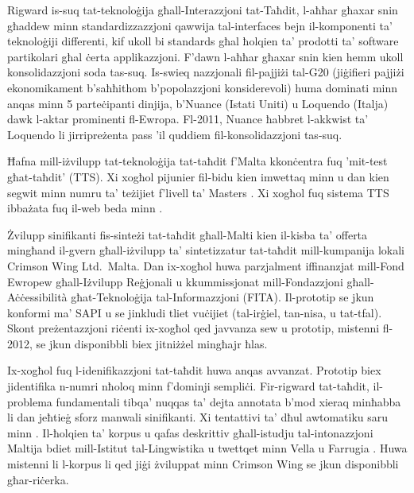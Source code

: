 \begin{multicols}{2}

Rigward is-suq tat-teknoloġija għall-Interazzjoni tat-Taħdit, l-aħħar għaxar snin għaddew minn standardizzazzjoni qawwija tal-interfaces bejn il-komponenti ta’ teknoloġiji differenti, kif ukoll bi standards għal ħolqien ta’ prodotti ta’ software partikolari għal ċerta applikazzjoni. F’dawn l-aħħar għaxar snin kien hemm ukoll konsolidazzjoni soda tas-suq. Is-swieq nazzjonali fil-pajjiżi tal-G20 (jiġifieri pajjiżi ekonomikament b'saħħithom b’popolazzjoni konsiderevoli) huma dominati minn anqas minn 5 parteċipanti dinjija, b’Nuance (Istati Uniti) u Loquendo (Italja) dawk l-aktar prominenti fl-Ewropa. Fl-2011, Nuance ħabbret l-akkwist ta' Loquendo li jirripreżenta pass 'il quddiem fil-konsolidazzjoni tas-suq.

Ħafna mill-iżvilupp tat-teknoloġija tat-taħdit f'Malta kkonċentra fuq 'mit-test għat-taħdit' (TTS). Xi xogħol pijunier fil-bidu kien imwettaq minn \cite{Micallef:1997} u dan kien segwit minn numru ta’ teżijiet f’livell ta’ Masters \cite{Farrugia:2005}. Xi xogħol fuq sistema TTS ibbażata fuq il-web beda minn \cite{Buhagiar-Micallef:2008}.

Żvilupp sinifikanti fis-sinteżi tat-taħdit għall-Malti kien il-kisba ta’ offerta mingħand il-gvern għall-iżvilupp ta’ sintetizzatur tat-taħdit mill-kumpanija lokali Crimson Wing Ltd.~Malta. Dan ix-xogħol huwa parzjalment iffinanzjat mill-Fond Ewropew għall-Iżvilupp Reġjonali u kkummissjonat mill-Fondazzjoni għall-Aċċessibilità għat-Teknoloġija tal-Informazzjoni (FITA). Il-prototip se jkun konformi ma’ SAPI u se jinkludi tliet vuċijiet (tal-irġiel, tan-nisa, u tat-tfal). Skont preżentazzjoni riċenti \cite{Borg-et-al:2011} ix-xogħol qed javvanza sew u prototip, mistenni fl-2012, se jkun disponibbli biex jitniżżel mingħajr ħlas.

Ix-xogħol fuq l-idenifikazzjoni tat-taħdit huwa anqas avvanzat. Prototip biex jidentifika n-numri nħoloq minn \cite{Calleja:2002} f’dominji sempliċi. Fir-rigward tat-taħdit, il-problema fundamentali tibqa’ nuqqas ta’ dejta annotata b’mod xieraq minħabba li dan jeħtieġ sforz manwali sinifikanti. Xi tentattivi ta’ dħul awtomatiku saru minn \cite{Psaila:2008}. Il-ħolqien ta’ korpus u qafas deskrittiv għall-istudju tal-intonazzjoni Maltija bdiet mill-Istitut tal-Lingwistika u twettqet minn Vella u Farrugia \cite{Vella-Farrugia:2006}. Huwa mistenni li l-korpus li qed jiġi żviluppat minn Crimson Wing se jkun disponibbli għar-riċerka.


\end{multicols}
